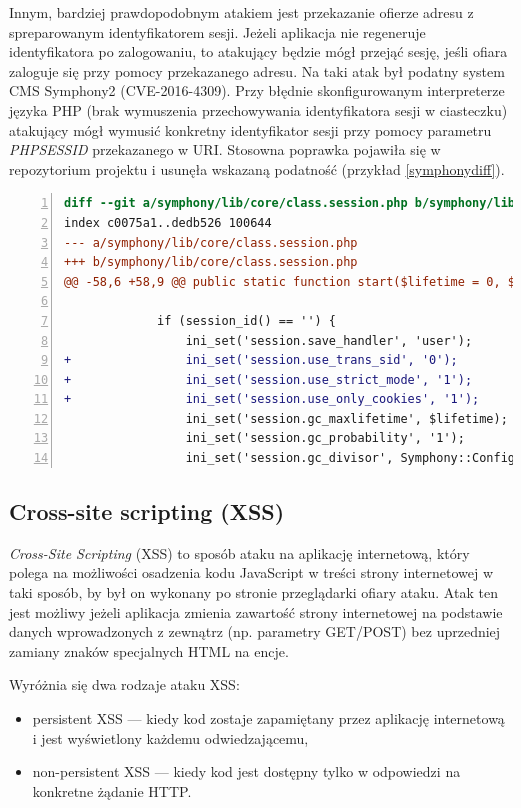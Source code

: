 \documentclass[11pt,a4paper,polish,thesis,oneside]{dcsbook}
\begin{document}
Innym, bardziej prawdopodobnym atakiem jest przekazanie ofierze adresu z spreparowanym identyfikatorem sesji. Jeżeli aplikacja nie regeneruje identyfikatora po zalogowaniu, to atakujący będzie mógł przejąć sesję, jeśli ofiara zaloguje się przy pomocy przekazanego adresu. Na taki atak był podatny system CMS Symphony2 (CVE-2016-4309). Przy błędnie skonfigurowanym interpreterze języka PHP (brak wymuszenia przechowywania identyfikatora sesji w ciasteczku) atakujący mógł wymusić konkretny identyfikator sesji przy pomocy parametru \textit{PHPSESSID} przekazanego w URI. Stosowna poprawka pojawiła się w repozytorium projektu i usunęła wskazaną podatność (przykład \ref{symphonydiff}).

\begin{lstlisting}[language=diff,frame=single,caption=łatka naprawiająca podatność fiksacji sesji w Symphony2 \cite{symphony},label=symphonydiff,numbers=left]
diff --git a/symphony/lib/core/class.session.php b/symphony/lib/core/class.session.php
index c0075a1..dedb526 100644
--- a/symphony/lib/core/class.session.php
+++ b/symphony/lib/core/class.session.php
@@ -58,6 +58,9 @@ public static function start($lifetime = 0, $path = '/', $domain = null, $httpOn
 
             if (session_id() == '') {
                 ini_set('session.save_handler', 'user');
+                ini_set('session.use_trans_sid', '0');
+                ini_set('session.use_strict_mode', '1');
+                ini_set('session.use_only_cookies', '1');
                 ini_set('session.gc_maxlifetime', $lifetime);
                 ini_set('session.gc_probability', '1');
                 ini_set('session.gc_divisor', Symphony::Configuration()->get('session_gc_divisor', 'symphony'));
\end{lstlisting}

\subsection{Cross-site scripting (XSS)}
\textit{Cross-Site Scripting} (XSS) to sposób ataku na aplikację internetową, który polega na możliwości osadzenia kodu JavaScript w treści strony internetowej w taki sposób, by był on wykonany po stronie przeglądarki ofiary ataku. Atak ten jest możliwy jeżeli aplikacja zmienia zawartość strony internetowej na podstawie danych wprowadzonych z zewnątrz (np. parametry GET/POST) bez uprzedniej zamiany znaków specjalnych HTML na encje. 

Wyróżnia się dwa rodzaje ataku XSS:
\begin{itemize}
\item persistent XSS --- kiedy kod zostaje zapamiętany przez aplikację internetową i jest wyświetlony każdemu odwiedzającemu,
\item non-persistent XSS --- kiedy kod jest dostępny tylko w odpowiedzi na konkretne żądanie HTTP.
\end{itemize}
\end{document}
